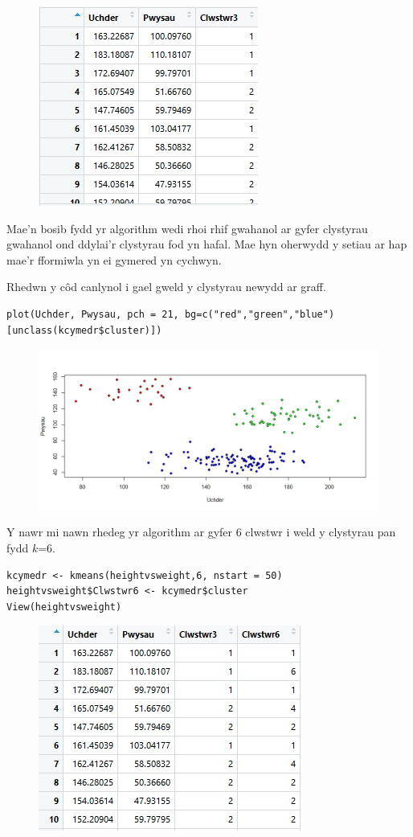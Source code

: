 \begin{figure}[H]
\includegraphics[width=0.5\linewidth]{../img/Data3_yn_R.jpg}
\end{figure}

Mae'n bosib fydd yr algorithm wedi rhoi rhif gwahanol ar gyfer clystyrau gwahanol ond ddylai'r clystyrau fod yn hafal. Mae hyn oherwydd y setiau ar hap mae'r fformiwla yn ei gymered yn cychwyn.

Rhedwn y c\^{o}d canlynol i gael gweld y clystyrau newydd ar graff.

\begin{verbatim}
plot(Uchder, Pwysau, pch = 21, bg=c("red","green","blue")[unclass(kcymedr$cluster)])
\end{verbatim}

\begin{figure}[H]
\includegraphics[width=0.5\linewidth]{../img/3clwstwrR.jpeg}
\end{figure}

Y nawr mi nawn rhedeg yr algorithm ar gyfer 6 clwstwr i weld y clystyrau pan fydd $k$=6. 

\begin{verbatim}
kcymedr <- kmeans(heightvsweight,6, nstart = 50)
heightvsweight$Clwstwr6 <- kcymedr$cluster
View(heightvsweight)
\end{verbatim}

\begin{figure}[H]
\includegraphics[width=0.5\linewidth]{../img/Data6_yn_R.jpg}
\end{figure}

